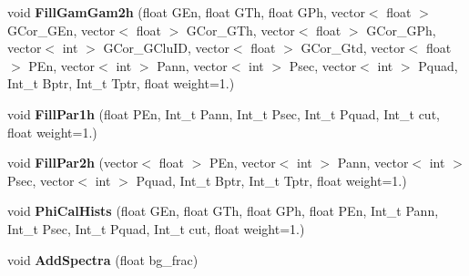 \begin{DoxyCompactItemize}
void {\bfseries Fill\+Gam\+Gam2h} (float G\+En, float G\+Th, float G\+Ph, vector$<$ float $>$ G\+Cor\+\_\+\+G\+En, vector$<$ float $>$ G\+Cor\+\_\+\+G\+Th, vector$<$ float $>$ G\+Cor\+\_\+\+G\+Ph, vector$<$ int $>$ G\+Cor\+\_\+\+G\+Clu\+ID, vector$<$ float $>$ G\+Cor\+\_\+\+Gtd, vector$<$ float $>$ P\+En, vector$<$ int $>$ Pann, vector$<$ int $>$ Psec, vector$<$ int $>$ Pquad, Int\+\_\+t Bptr, Int\+\_\+t Tptr, float weight=1.)
\item 
\mbox{\label{classhists_a618651882b77d410480e624dfd4b8ee4}} 
void {\bfseries Fill\+Par1h} (float P\+En, Int\+\_\+t Pann, Int\+\_\+t Psec, Int\+\_\+t Pquad, Int\+\_\+t cut, float weight=1.)
\item 
\mbox{\label{classhists_abdb2e69023e9fdd9080bcef611c26125}} 
void {\bfseries Fill\+Par2h} (vector$<$ float $>$ P\+En, vector$<$ int $>$ Pann, vector$<$ int $>$ Psec, vector$<$ int $>$ Pquad, Int\+\_\+t Bptr, Int\+\_\+t Tptr, float weight=1.)
\item 
\mbox{\label{classhists_ab48ef7120a82723ec1db8fde8143d532}} 
void {\bfseries Phi\+Cal\+Hists} (float G\+En, float G\+Th, float G\+Ph, float P\+En, Int\+\_\+t Pann, Int\+\_\+t Psec, Int\+\_\+t Pquad, Int\+\_\+t cut, float weight=1.)
\item 
\mbox{\label{classhists_a52b2233e6775d4a9bf714368101116cb}} 
void {\bfseries Add\+Spectra} (float bg\+\_\+frac)
\end{DoxyCompactItemize}
